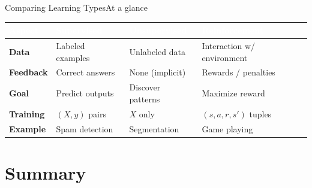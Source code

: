 \documentclass[aspectratio=169,11pt]{beamer}
\begin{document}
\begin{frame}{Comparing Learning Types}{At a glance}
  \small
  \renewcommand{\arraystretch}{1.3}
  \begin{center}
  \begin{tabularx}{\textwidth}{@{}>{\bfseries}l >{\raggedright\arraybackslash}X >{\raggedright\arraybackslash}X >{\raggedright\arraybackslash}X@{}}
    \toprule
    \rowcolor{PrimaryDark}
    \textcolor{white}{Aspect} & \textcolor{white}{Supervised} &
    \textcolor{white}{Unsupervised} & \textcolor{white}{Reinforcement} \\
    \midrule
    Data & Labeled examples & Unlabeled data & Interaction w/ environment \\
    \rowcolor{PrimaryLight!25}
    Feedback & Correct answers & None (implicit) & Rewards / penalties \\
    Goal & Predict outputs & Discover patterns & Maximize reward \\
    \rowcolor{PrimaryLight!25}
    Training & $(X,y)$ pairs & $X$ only & $(s,a,r,s')$ tuples \\
    Example & Spam detection & Segmentation & Game playing \\
    \bottomrule
  \end{tabularx}
  \end{center}
\end{frame}

\section{Summary}
\end{document}
